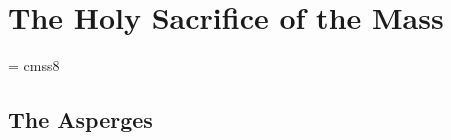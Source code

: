\def\tabmark{The Mass}
\chapter{The Holy Sacrifice of the Mass}

{\setlength{\parskip}{6pt}



\label{cha:themass}

\font\notelett = cmss8

\def\celebrant#1{\Pnobar #1}
\def\all#1{\Rbar \textbf{#1}}



\def\See#1{\relax}

\normalsize%

\section{The Asperges}






}
